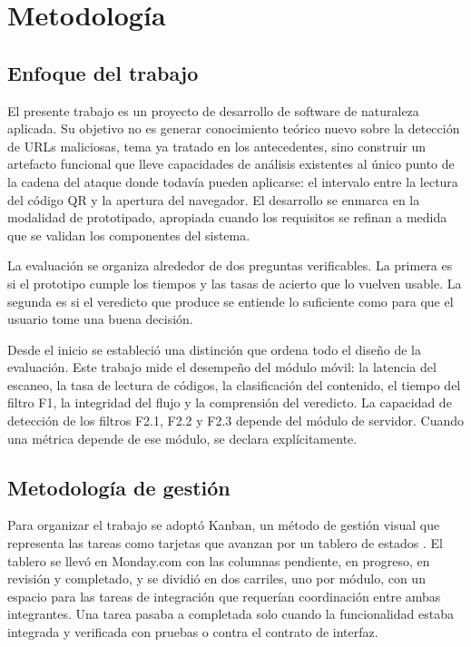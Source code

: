 \chapter{Metodología}
\label{chap:metodologia}

\section{Enfoque del trabajo}

El presente trabajo es un proyecto de desarrollo de software de naturaleza aplicada. Su objetivo no es generar conocimiento teórico nuevo sobre la detección de URLs maliciosas, tema ya tratado en los antecedentes, sino construir un artefacto funcional que lleve capacidades de análisis existentes al único punto de la cadena del ataque donde todavía pueden aplicarse: el intervalo entre la lectura del código QR y la apertura del navegador. El desarrollo se enmarca en la modalidad de prototipado, apropiada cuando los requisitos se refinan a medida que se validan los componentes del sistema.

La evaluación se organiza alrededor de dos preguntas verificables. La primera es si el prototipo cumple los tiempos y las tasas de acierto que lo vuelven usable. La segunda es si el veredicto que produce se entiende lo suficiente como para que el usuario tome una buena decisión.

Desde el inicio se estableció una distinción que ordena todo el diseño de la evaluación. Este trabajo mide el desempeño del módulo móvil: la latencia del escaneo, la tasa de lectura de códigos, la clasificación del contenido, el tiempo del filtro F1, la integridad del flujo y la comprensión del veredicto. La capacidad de detección de los filtros F2.1, F2.2 y F2.3 depende del módulo de servidor. Cuando una métrica depende de ese módulo, se declara explícitamente.

\section{Metodología de gestión}

Para organizar el trabajo se adoptó Kanban, un método de gestión visual que representa las tareas como tarjetas que avanzan por un tablero de estados \cite{anderson2010kanban}. El tablero se llevó en Monday.com con las columnas pendiente, en progreso, en revisión y completado, y se dividió en dos carriles, uno por módulo, con un espacio para las tareas de integración que requerían coordinación entre ambas integrantes. Una tarea pasaba a completada solo cuando la funcionalidad estaba integrada y verificada con pruebas o contra el contrato de interfaz.

